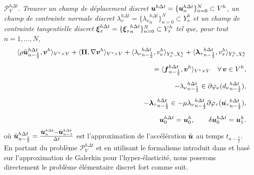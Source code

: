 \medskip {} ${\mathcal P}_V^{h\Delta t}$. {\it
	Trouver un champ de déplacement discret
	$\mbox{\boldmath{$u$}}^{h\Delta t}=\{\mbox{\boldmath{$u$}}_n^{h\Delta t}\}_{n=0}^N\subset V^h$, un champ de contrainte normale discret $\lambda_{\nu}^{h\Delta t} =\{{\lambda_{\nu}}_{n}^{h\Delta t}\}_{n=0}^N
	\subset Y^h_\nu$ et un champ de contrainte tangentielle discret
	$\mbox{\boldmath{$\xi$}}_{\tau}^{h\Delta t} =\{{\mbox{\boldmath{$\xi$}}_{\tau}}_{n}^{h\Delta t}\}_{n=0}^N \subset
	Y^h_\tau$ tel que, pour tout $n=1,\ldots,N$,}
\begin{eqnarray}
&&   \langle {\rho}{\ddot{\mbox{\boldmath{$u$}}}^{h\Delta t}_{n-\frac{1}{2}}},\mbox{\boldmath{$v$}}^h \rangle_{V^*\times V} + \langle \boldsymbol{\Pi},\nabla\mbox{\boldmath{$v$}}^h \rangle_{V^*\times V} +   \langle {\lambda_{\nu}}^{h\Delta t}_{n-\frac{1}{2}},v^h_{\nu}\rangle_{Y^h_\nu,X^h_\nu} + \langle
{\mbox{\boldmath{$\lambda$}}_{\tau}}^{h\Delta t}_{n-\frac{1}{2}},v^h_{\tau}\rangle_{Y^h_\tau,X^h_{\tau}} \nonumber  \\[2mm]
&&
\qquad \qquad \qquad \qquad \qquad \qquad =  \langle \mbox{\boldmath{$f$}}^{h\Delta t}_{n-\frac{1}{2}},\mbox{\boldmath{$v$}}^h \rangle_{V^*\times V} \quad
\forall\,\mbox{\boldmath{$v$}}\in V^h, \label{LMh} \\[2mm]
&&\label{LMch} -{\lambda_{\nu}}^{h\Delta t}_{n-\frac{1}{2}}\in
\partial\varphi_\nu({d_{\nu}}^{h\Delta t}_{n-\frac{1}{2}}),\\[2mm]
&&\label{LMfh} -{\mbox{\boldmath{$\lambda$}}_{\tau}}^{h\Delta t}_{n-\frac{1}{2}}\in -\mu  {\lambda_\nu}^{h\Delta t}_{n-\frac{1}{2}} \partial\varphi_\tau(\dot{{\mbox{\boldmath{$u$}}}_{\tau}}^{h\Delta t}_{n-\frac{1}{2}}),\\[2mm]
&&\label{cih1} \mbox{\boldmath{$u$}}^{h\Delta t}_{0}=\mbox{\boldmath{$u$}}^{h}_{0}, \quad\quad
\delta\mbox{\boldmath{$u$}}^{h\Delta t}_{0}=\mbox{\boldmath{$u$}}^{h}_{1}.
\end{eqnarray}
où $\ddot{\mbox{\boldmath{$u$}}}^{h\Delta t}_{n-\frac{1}{2}} = \frac{\dot{\mbox{\boldmath{$u$}}}^{h\Delta t}_{n}-\dot{\mbox{\boldmath{$u$}}}^{h\Delta t}_{n-1}}{\Delta t}$ est l'approximation de l'accélération ${\ddot{\mbox{\boldmath{$u$}}}}$ au temps $t_{n-\frac{1}{2}}$.\\

En partant du problème ${\mathcal P}_V^{h\Delta t}$ et en utilisant le formalisme introduit dans \cite{pietrzak1999large} et \cite{laursen2013computational} basé sur l'approximation de Galerkin pour l'hyper-élasticité, nous poserons directement le problème élémentaire discret fort comme suit.

